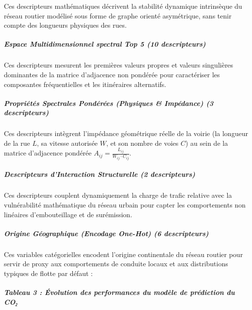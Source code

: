 \documentclass[10pt, a4paper]{article}
\begin{document}
Ces descripteurs mathématiques décrivent la stabilité dynamique
intrinsèque du réseau routier modélisé sous forme de graphe orienté
asymétrique, sans tenir compte des longueurs physiques des rues.

\subparagraph{Espace Multidimensionnel spectral Top 5 (10
descripteurs)}\label{espace-multidimensionnel-spectral-top-5-10-descripteurs}

Ces descripteurs mesurent les premières valeurs propres et valeurs
singulières dominantes de la matrice d'adjacence non pondérée pour
caractériser les composantes fréquentielles et les itinéraires
alternatifs.

\subparagraph{Propriétés Spectrales Pondérées (Physiques \& Impédance)
(3
descripteurs)}\label{propriuxe9tuxe9s-spectrales-ponduxe9ruxe9es-physiques-impuxe9dance-3-descripteurs}

Ces descripteurs intègrent l'impédance géométrique réelle de la voirie
(la longueur de la rue \(L\), sa vitesse autorisée \(W\), et son nombre
de voies \(C\)) au sein de la matrice d'adjacence pondérée
\(A_{ij} = \frac{L_{ij}}{W_{ij} \cdot C_{ij}}\).

\subparagraph{Descripteurs d'Interaction Structurelle (2
descripteurs)}\label{descripteurs-dinteraction-structurelle-2-descripteurs}

Ces descripteurs couplent dynamiquement la charge de trafic relative
avec la vulnérabilité mathématique du réseau urbain pour capter les
comportements non linéaires d'embouteillage et de surémission.

\subparagraph{Origine Géographique (Encodage One-Hot) (6
descripteurs)}\label{origine-guxe9ographique-encodage-one-hot-6-descripteurs}

Ces variables catégorielles encodent l'origine continentale du réseau
routier pour servir de proxy aux comportements de conduite locaux et aux
distributions typiques de flotte par défaut :

\subparagraph{Tableau 3 : Évolution des performances du modèle de
prédiction du
CO₂}\label{tableau-3-uxe9volution-des-performances-du-moduxe8le-de-pruxe9diction-du-coux2082}
\end{document}
